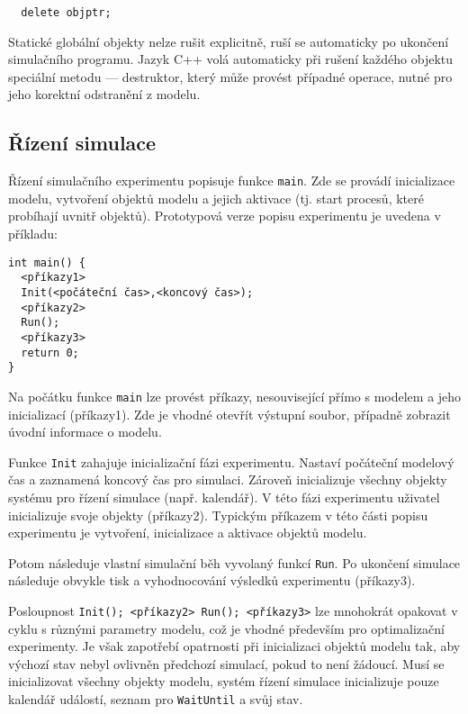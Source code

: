 \documentclass[a4paper]{article}
\begin{document}
\begin{verbatim}
  delete objptr;
\end{verbatim}

Statické globální objekty nelze rušit explicitně, ruší se automaticky po
ukončení simulačního programu. Jazyk C++ volá automaticky při rušení každého
objektu speciální metodu --- destruktor, který může provést případné operace,
nutné pro jeho korektní odstranění z modelu.


\subsection{Řízení simulace}

Řízení simulačního experimentu popisuje funkce \verb|main|. Zde se
provádí inicializace modelu, vytvoření objektů modelu a jejich
aktivace (tj. start procesů, které probíhají uvnitř objektů).
Prototypová verze popisu experimentu je uvedena v příkladu:

\begin{verbatim}
int main() {
  <příkazy1>
  Init(<počáteční čas>,<koncový čas>);
  <příkazy2>
  Run();
  <příkazy3>
  return 0;
}
\end{verbatim}

Na počátku funkce \verb|main| lze provést příkazy, nesouvisející přímo
s modelem a jeho inicializací (příkazy1). Zde je vhodné
otevřít výstupní soubor, případně zobrazit úvodní informace
o modelu.

Funkce \verb|Init| zahajuje inicializační fázi experimentu. Nastaví
počáteční modelový čas a zaznamená koncový čas pro simulaci.
Zároveň inicializuje všechny objekty systému pro řízení simulace
(např. kalendář). V této fázi experimentu uživatel inicializuje
svoje objekty (příkazy2). Typickým příkazem v této části
popisu experimentu je vytvoření, inicializace a aktivace objektů
modelu.

Potom následuje vlastní simulační běh vyvolaný funkcí \verb|Run|. Po
ukončení simulace následuje obvykle tisk a vyhodnocování
výsledků experimentu (příkazy3).

Posloupnost \verb|Init(); <příkazy2> Run(); <příkazy3>| lze
mnohokrát opakovat v cyklu s různými parametry modelu, což je
vhodné především pro optimalizační experimenty. Je však
zapotřebí opatrnosti při inicializaci objektů modelu tak, aby
výchozí stav nebyl ovlivněn předchozí simulací, pokud to není
žádoucí. Musí se inicializovat všechny objekty modelu, systém
řízení simulace inicializuje pouze kalendář událostí, seznam pro
\verb|WaitUntil| a svůj stav.
\end{document}
